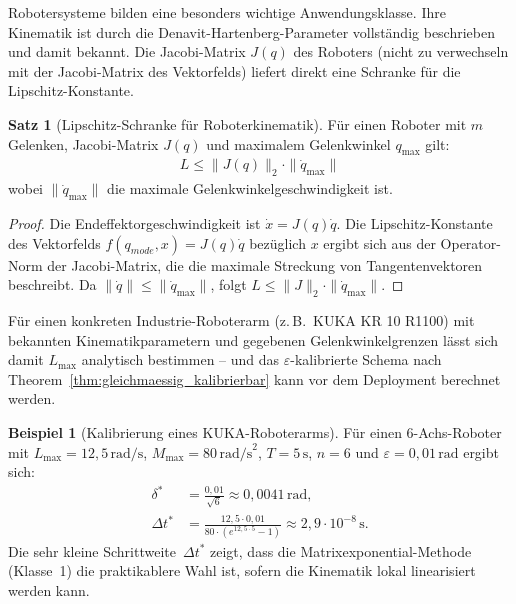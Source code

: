 ﻿\documentclass[a4paper,12pt]{article}
\theoremstyle{definition}
\newtheorem{beispiel}{Beispiel}[section]
\newtheorem{satz}{Satz}[section]
\begin{document}
Robotersysteme bilden eine besonders wichtige Anwendungsklasse. Ihre Kinematik ist durch die Denavit-Hartenberg-Parameter vollständig beschrieben und damit bekannt. Die Jacobi-Matrix $J(q)$ des Roboters (nicht zu verwechseln mit der Jacobi-Matrix des Vektorfelds) liefert direkt eine Schranke für die Lipschitz-Konstante.

\begin{satz}[Lipschitz-Schranke für Roboterkinematik]
Für einen Roboter mit $m$ Gelenken, Jacobi-Matrix $J(q)$ und maximalem Gelenkwinkel $q_{\max}$ gilt:
\begin{align}
  L \leq \|J(q)\|_2 \cdot \|\dot{q}_{\max}\|
\end{align}
wobei $\|\dot{q}_{\max}\|$ die maximale Gelenkwinkelgeschwindigkeit ist.
\end{satz}

\begin{proof}
Die Endeffektorgeschwindigkeit ist $\dot{x} = J(q)\dot{q}$. Die Lipschitz-Konstante des Vektorfelds $f(q_{\mathit{mode}}, x) = J(q)\dot{q}$ bezüglich $x$ ergibt sich aus der Operator-Norm der Jacobi-Matrix, die die maximale Streckung von Tangentenvektoren beschreibt. Da $\|\dot{q}\| \leq \|\dot{q}_{\max}\|$, folgt $L \leq \|J\|_2 \cdot \|\dot{q}_{\max}\|$.
\end{proof}

Für einen konkreten Industrie-Roboterarm (z.\,B.\ KUKA KR 10 R1100) mit bekannten Kinematikparametern und gegebenen Gelenkwinkelgrenzen lässt sich damit $L_{\max}$ analytisch bestimmen -- und das $\varepsilon$-kalibrierte Schema nach Theorem~\ref{thm:gleichmaessig_kalibrierbar} kann vor dem Deployment berechnet werden.

\begin{beispiel}[Kalibrierung eines KUKA-Roboterarms]
Für einen 6-Achs-Roboter mit $L_{\max} = 12{,}5\,\text{rad/s}$,
$M_{\max} = 80\,\text{rad/s}^2$, $T = 5\,\text{s}$, $n=6$
und $\varepsilon = 0{,}01\,\text{rad}$ ergibt sich:
\begin{align}
  \delta^* &= \frac{0{,}01}{\sqrt{6}} \approx 0{,}0041\,\text{rad}, \\
  \Delta t^* &= \frac{12{,}5 \cdot 0{,}01}{80 \cdot (e^{12{,}5 \cdot 5} - 1)} \approx 2{,}9 \cdot 10^{-8}\,\text{s}.
\end{align}
Die sehr kleine Schrittweite~$\Delta t^*$ zeigt, dass die Matrixexponential-Methode (Klasse~1) die praktikablere Wahl ist, sofern die Kinematik lokal linearisiert werden kann.
\end{beispiel}
\end{document}
